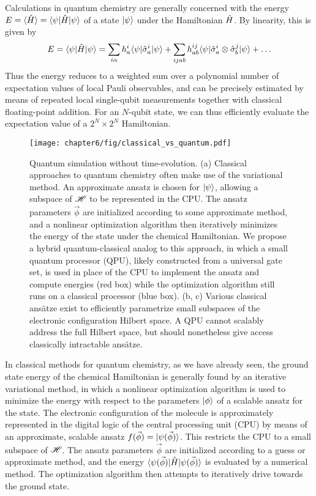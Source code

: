 Calculations in quantum chemistry are generally concerned with the energy $E = \langle \hat{H} \rangle = \mbox{$ \langle \psi | $} \hat{H} \mbox{$ | \psi \rangle $}$ of a state $\mbox{$ | \psi \rangle $}$ under the Hamiltonian $\hat{H}$. By linearity, this is given by
\begin{equation}
    E=
    \langle \psi | \hat{H} | \psi \rangle= 
    \sum_{i\alpha} h_a ^ i \langle \psi | \hat{\sigma}_a ^ i | \psi \rangle +
    \sum_{i j a b} h_{a b} ^ {ij} \langle \psi | \hat{\sigma}_a^i \otimes \hat{\sigma}_b^j| \psi  \rangle + 
    \ldots
    \label{eqn:chemistry-energy-evaluation}
\end{equation}
Thus the energy reduces to a weighted sum over a polynomial number of expectation values of local Pauli observables, and can be precisely estimated by means of repeated local single-qubit measurements together with classical floating-point addition. For an $N$-qubit state, we can thus efficiently evaluate the expectation value of a $2^N \times 2^N$ Hamiltonian.

\begin{figure}[t!]
\centering
\texttt{[image: chapter6/fig/classical\_vs\_quantum.pdf]}
\caption[Quantum simulation without time-evolution]{
Quantum simulation without time-evolution. (a) Classical approaches to quantum chemistry often make use of the variational method. An approximate ansatz is chosen for $\mbox{$ | \psi \rangle $}$, allowing a subspace of $\mathscr{H}$ to be represented in the CPU. The ansatz parameters $\vec{\phi}$ are initialized according to some approximate method, and a nonlinear optimization algorithm then iteratively minimizes the energy of the state under the chemical Hamiltonian.  We propose a hybrid quantum-classical analog to this approach, in which a small quantum processor (QPU), likely constructed from a universal gate set, is used in place of the CPU to implement the ansatz and compute energies (red box) while the optimization algorithm still runs on a classical processor (blue box). (b, c) Various classical ans\"atze exist to efficiently parametrize small subspaces of the electronic configuration Hilbert space. A QPU cannot scalably address the full Hilbert space, but should nonetheless give access classically intractable ans\"atze. }
\label{fig:classical-vs-quantum}
\end{figure}

In classical methods for quantum chemistry, as we have already seen, the ground state energy of the chemical Hamiltonian is generally found by an iterative variational method, in which a nonlinear optimization algorithm is used to minimize the energy with respect to the parameters $\mbox{$ | \phi \rangle $}$ of a scalable ansatz for the state.  The electronic configuration of the molecule is approximately represented in the digital logic of the central processing unit (CPU) by means of an approximate, scalable ansatz $f(\vec{\phi}) = \mbox{$ | \psi(\vec{\phi}) \rangle $}$. This restricts the CPU to a small subspace of $\mathscr{H}$. The ansatz parameters $\vec{\phi}$ are initialized according to a guess or approximate method, and the energy $\mbox{$ \langle \psi(\vec{\phi}) | $}\hat{H}\mbox{$ | \psi(\vec{\phi}) \rangle $}$ is evaluated by a numerical method.  The optimization algorithm then attempts to iteratively drive towards the ground state.

